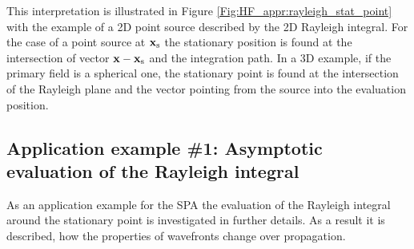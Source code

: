This interpretation is illustrated in Figure \ref{Fig:HF_appr:rayleigh_stat_point} with the example of a 2D point source described by the 2D Rayleigh integral.
For the case of a point source at $\mathbf{x}_{\mathrm{s}}$ the stationary position is found at the intersection of vector $\mathbf{x}-\mathbf{x}_{\mathrm{s}}$ and the integration path.
In a 3D example, if the primary field is a spherical one, the stationary point is found at the intersection of the Rayleigh plane and the vector pointing from the source into the evaluation position.

\subsection*{Application example \#1: Asymptotic evaluation of the Rayleigh integral}
\label{Sec:HF:RayleighSPA}
As an application example for the SPA the evaluation of the Rayleigh integral around the stationary point is investigated in further details.
As a result it is described, how the properties of wavefronts change over propagation.


